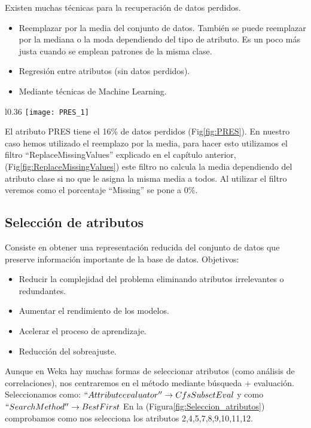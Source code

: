 Existen muchas técnicas para la recuperación de datos perdidos.
\begin{itemize}
	\item Reemplazar por la media del conjunto de datos. También se puede reemplazar por la mediana o la moda dependiendo del tipo de atributo. Es un poco más justa cuando se emplean patrones de la misma clase.
	\item Regresión entre atributos (sin datos perdidos).
	\item Mediante técnicas de Machine Learning.
\end{itemize}
\newpage

\begin{wrapfigure}{l}{0.36\textwidth}
	\texttt{[image: PRES\_1]}
	\caption{Atributo PRES}
	\label{fig:PRES}
\end{wrapfigure}

El atributo PRES tiene el 16\% de datos perdidos (Fig\ref{fig:PRES}). 
En nuestro caso hemos utilizado el reemplazo por la media, para hacer esto utilizamos el filtro ``ReplaceMissingValues'' explicado en el capítulo anterior, (Fig\ref{fig:ReplaceMissingValues}) este filtro no calcula la media dependiendo del atributo clase si no que le asigna la misma media a todos. Al utilizar el filtro veremos como el porcentaje ``Missing'' se pone a 0\%.

\subsection{Selección de atributos}

Consiste en obtener una representación reducida del conjunto de datos que preserve información importante de la base de datos. Objetivos: 

\begin{itemize}
	\item Reducir la complejidad del problema eliminando atributos irrelevantes o redundantes.
	\item Aumentar el rendimiento de los modelos.
	\item Acelerar el proceso de aprendizaje.
	\item Reducción del sobreajuste.
\end{itemize}

Aunque en Weka hay muchas formas de seleccionar atributos (como análisis de correlaciones), nos centraremos en el método mediante búsqueda + evaluación. Seleccionamos como: $ ``Attribute evaluator'' \rightarrow CfsSubsetEval$ y como $ ``Search Method'' \rightarrow BestFirst $  
En la (Figura\ref{fig:Seleccion_atributos}) comprobamos como nos selecciona los atributos 2,4,5,7,8,9,10,11,12.

